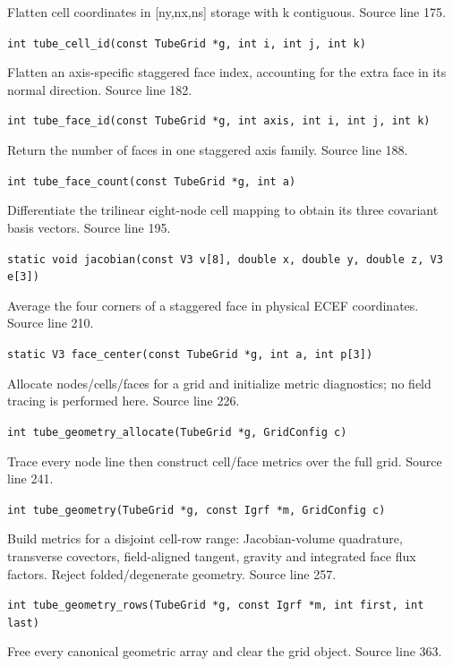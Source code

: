 \begin{description}[style=nextline,leftmargin=0pt,labelindent=0pt,labelwidth=0pt,labelsep=0pt]
\item[\texttt{tube\_cell\_id}] Flatten cell coordinates in [ny,nx,ns] storage with k contiguous. Source line 175.\par
{\small\nolinkurl{int tube_cell_id(const TubeGrid *g, int i, int j, int k)}}
\item[\texttt{tube\_face\_id}] Flatten an axis-specific staggered face index, accounting for the extra face in its normal direction. Source line 182.\par
{\small\nolinkurl{int tube_face_id(const TubeGrid *g, int axis, int i, int j, int k)}}
\item[\texttt{tube\_face\_count}] Return the number of faces in one staggered axis family. Source line 188.\par
{\small\nolinkurl{int tube_face_count(const TubeGrid *g, int a)}}
\item[\texttt{jacobian}] Differentiate the trilinear eight-node cell mapping to obtain its three covariant basis vectors. Source line 195.\par
{\small\nolinkurl{static void jacobian(const V3 v[8], double x, double y, double z, V3 e[3])}}
\item[\texttt{face\_center}] Average the four corners of a staggered face in physical ECEF coordinates. Source line 210.\par
{\small\nolinkurl{static V3 face_center(const TubeGrid *g, int a, int p[3])}}
\item[\texttt{tube\_geometry\_allocate}] Allocate nodes/cells/faces for a grid and initialize metric diagnostics; no field tracing is performed here. Source line 226.\par
{\small\nolinkurl{int tube_geometry_allocate(TubeGrid *g, GridConfig c)}}
\item[\texttt{tube\_geometry}] Trace every node line then construct cell/face metrics over the full grid. Source line 241.\par
{\small\nolinkurl{int tube_geometry(TubeGrid *g, const Igrf *m, GridConfig c)}}
\item[\texttt{tube\_geometry\_rows}] Build metrics for a disjoint cell-row range: Jacobian-volume quadrature, transverse covectors, field-aligned tangent, gravity and integrated face flux factors. Reject folded/degenerate geometry. Source line 257.\par
{\small\nolinkurl{int tube_geometry_rows(TubeGrid *g, const Igrf *m, int first, int last)}}
\item[\texttt{tube\_free}] Free every canonical geometric array and clear the grid object. Source line 363.\par

\end{description}
